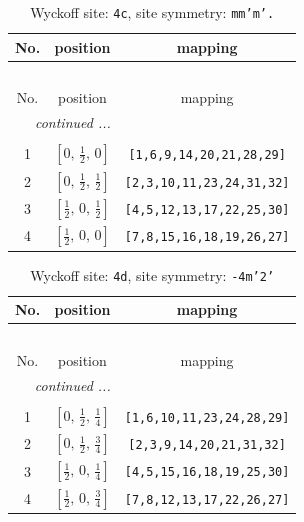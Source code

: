 \documentclass[fleqn,8pt]{jsarticle}
\begin{document}
\renewcommand{\arraystretch}{1.2}
\begin{longtable}{ccc}
\caption{Wyckoff site: {\tt 4c}, site symmetry: {\tt mm'm'.}}
 \\
 \hline \hline
No. & position & mapping \\ \hline \endfirsthead

\multicolumn{2}{l}{\tablename\ \thetable{}} \\
 \hline \hline
No. & position & mapping \\ \hline \endhead

 \hline \hline
\multicolumn{2}{r}{\footnotesize\it continued ...} \\ \endfoot

 \hline \hline
\multicolumn{2}{r}{} \\ \endlastfoot

1 & $\left[ 0,\, \frac{1}{2},\, 0 \right]$ & {\tt [1,6,9,14,20,21,28,29]} \\ \hline
2 & $\left[ 0,\, \frac{1}{2},\, \frac{1}{2} \right]$ & {\tt [2,3,10,11,23,24,31,32]} \\ \hline
3 & $\left[ \frac{1}{2},\, 0,\, \frac{1}{2} \right]$ & {\tt [4,5,12,13,17,22,25,30]} \\ \hline
4 & $\left[ \frac{1}{2},\, 0,\, 0 \right]$ & {\tt [7,8,15,16,18,19,26,27]} \\
\end{longtable}
\renewcommand{\arraystretch}{1.2}
\begin{longtable}{ccc}
\caption{Wyckoff site: {\tt 4d}, site symmetry: {\tt -4m'2'}}
 \\
 \hline \hline
No. & position & mapping \\ \hline \endfirsthead

\multicolumn{2}{l}{\tablename\ \thetable{}} \\
 \hline \hline
No. & position & mapping \\ \hline \endhead

 \hline \hline
\multicolumn{2}{r}{\footnotesize\it continued ...} \\ \endfoot

 \hline \hline
\multicolumn{2}{r}{} \\ \endlastfoot

1 & $\left[ 0,\, \frac{1}{2},\, \frac{1}{4} \right]$ & {\tt [1,6,10,11,23,24,28,29]} \\ \hline
2 & $\left[ 0,\, \frac{1}{2},\, \frac{3}{4} \right]$ & {\tt [2,3,9,14,20,21,31,32]} \\ \hline
3 & $\left[ \frac{1}{2},\, 0,\, \frac{1}{4} \right]$ & {\tt [4,5,15,16,18,19,25,30]} \\ \hline
4 & $\left[ \frac{1}{2},\, 0,\, \frac{3}{4} \right]$ & {\tt [7,8,12,13,17,22,26,27]} \\
\end{longtable}
\end{document}
